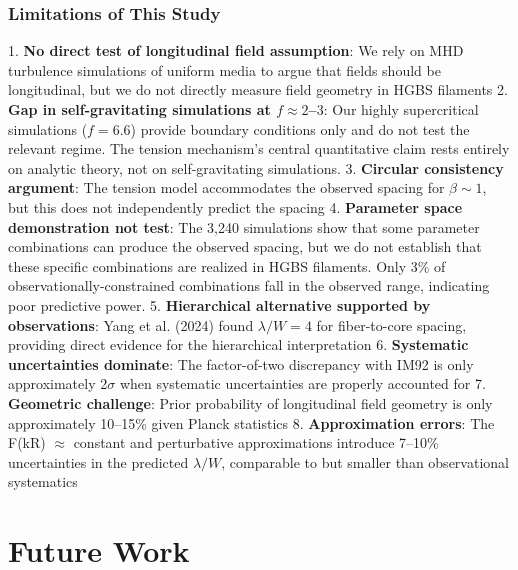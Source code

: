 \documentclass[11pt,a4paper]{article}
\begin{document}
\subsubsection{Limitations of This Study}

1. \textbf{No direct test of longitudinal field assumption}: We rely on MHD turbulence simulations of uniform media to argue that fields should be longitudinal, but we do not directly measure field geometry in HGBS filaments
2. \textbf{Gap in self-gravitating simulations at $f \approx 2$--$3$}: Our highly supercritical simulations ($f = 6.6$) provide boundary conditions only and do not test the relevant regime. The tension mechanism's central quantitative claim rests entirely on analytic theory, not on self-gravitating simulations.
3. \textbf{Circular consistency argument}: The tension model accommodates the observed spacing for $\beta \sim 1$, but this does not independently predict the spacing
4. \textbf{Parameter space demonstration not test}: The 3,240 simulations show that some parameter combinations can produce the observed spacing, but we do not establish that these specific combinations are realized in HGBS filaments. Only 3\% of observationally-constrained combinations fall in the observed range, indicating poor predictive power.
5. \textbf{Hierarchical alternative supported by observations}: Yang et al. (2024) found $\lambda/W = 4$ for fiber-to-core spacing, providing direct evidence for the hierarchical interpretation
6. \textbf{Systematic uncertainties dominate}: The factor-of-two discrepancy with IM92 is only approximately 2$\sigma$ when systematic uncertainties are properly accounted for
7. \textbf{Geometric challenge}: Prior probability of longitudinal field geometry is only approximately 10--15\% given Planck statistics
8. \textbf{Approximation errors}: The F(kR) $\approx$ constant and perturbative approximations introduce 7--10\% uncertainties in the predicted $\lambda/W$, comparable to but smaller than observational systematics

\section{Future Work}
\label{sec:future}
\end{document}
